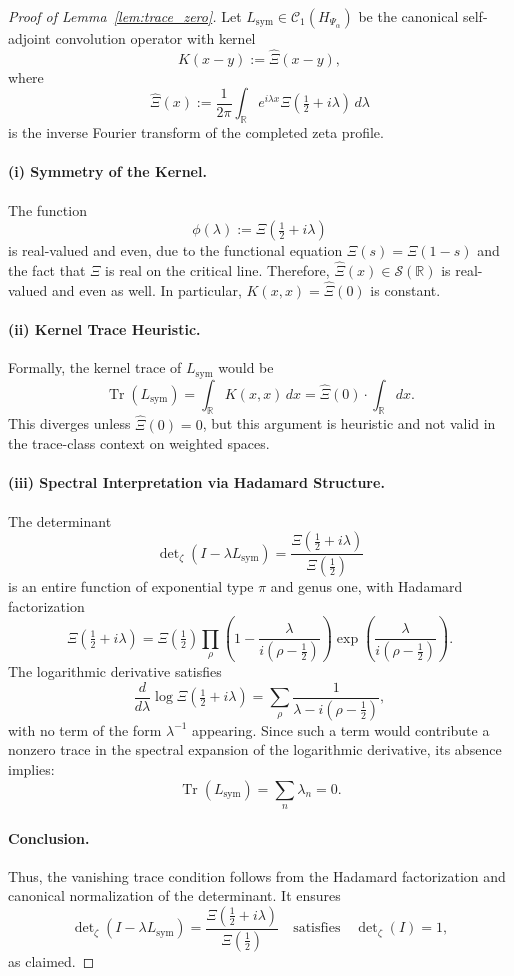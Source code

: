 \begin{proof}[Proof of Lemma~\ref{lem:trace_zero}]
Let \( L_{\mathrm{sym}} \in \mathcal{C}_1(H_{\Psi_\alpha}) \) be the canonical self-adjoint convolution operator with kernel
\[
K(x - y) := \widehat{\Xi}(x - y),
\]
where
\[
\widehat{\Xi}(x) := \frac{1}{2\pi} \int_{\mathbb{R}} e^{i\lambda x} \Xi\left( \tfrac{1}{2} + i\lambda \right) \, d\lambda
\]
is the inverse Fourier transform of the completed zeta profile.

\paragraph{(i) Symmetry of the Kernel.}
The function
\[
\phi(\lambda) := \Xi\left( \tfrac{1}{2} + i\lambda \right)
\]
is real-valued and even, due to the functional equation \( \Xi(s) = \Xi(1 - s) \) and the fact that \( \Xi \) is real on the critical line. Therefore, \( \widehat{\Xi}(x) \in \mathcal{S}(\mathbb{R}) \) is real-valued and even as well. In particular, \( K(x, x) = \widehat{\Xi}(0) \) is constant.

\paragraph{(ii) Kernel Trace Heuristic.}
Formally, the kernel trace of \( L_{\mathrm{sym}} \) would be
\[
\operatorname{Tr}(L_{\mathrm{sym}}) = \int_{\mathbb{R}} K(x, x)\, dx = \widehat{\Xi}(0) \cdot \int_{\mathbb{R}} dx.
\]
This diverges unless \( \widehat{\Xi}(0) = 0 \), but this argument is heuristic and not valid in the trace-class context on weighted spaces.

\paragraph{(iii) Spectral Interpretation via Hadamard Structure.}
The determinant
\[
\det\nolimits_\zeta(I - \lambda L_{\mathrm{sym}}) = \frac{\Xi\left( \tfrac{1}{2} + i\lambda \right)}{\Xi\left( \tfrac{1}{2} \right)}
\]
is an entire function of exponential type \( \pi \) and genus one, with Hadamard factorization
\[
\Xi\left( \tfrac{1}{2} + i\lambda \right)
= \Xi\left( \tfrac{1}{2} \right)
\prod_\rho \left(1 - \frac{\lambda}{i(\rho - \tfrac{1}{2})} \right)
\exp\left( \frac{\lambda}{i(\rho - \tfrac{1}{2})} \right).
\]
The logarithmic derivative satisfies
\[
\frac{d}{d\lambda} \log \Xi\left( \tfrac{1}{2} + i\lambda \right)
= \sum_\rho \frac{1}{\lambda - i(\rho - \tfrac{1}{2})},
\]
with no term of the form \( \lambda^{-1} \) appearing. Since such a term would contribute a nonzero trace in the spectral expansion of the logarithmic derivative, its absence implies:
\[
\operatorname{Tr}(L_{\mathrm{sym}}) = \sum_n \lambda_n = 0.
\]

\paragraph{Conclusion.}
Thus, the vanishing trace condition follows from the Hadamard factorization and canonical normalization of the determinant. It ensures
\[
\det\nolimits_\zeta(I - \lambda L_{\mathrm{sym}}) = \frac{\Xi\left( \tfrac{1}{2} + i\lambda \right)}{\Xi\left( \tfrac{1}{2} \right)}
\quad \text{satisfies} \quad \det\nolimits_\zeta(I) = 1,
\]
as claimed.
\end{proof}
% 